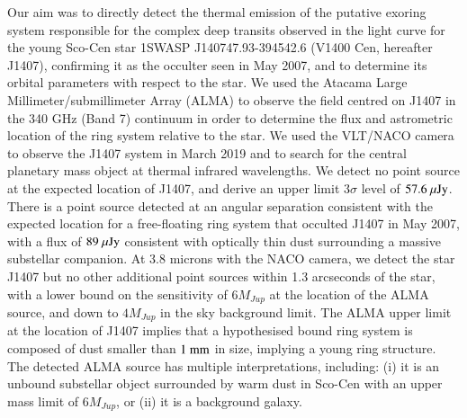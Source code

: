 \documentclass{aa} %
\begin{document}
   \date{Accepted 2019 November 16}


 
  \abstract
  {} %
  {Our aim was to directly detect the thermal emission of the putative exoring system responsible for the complex deep transits observed in the light curve for the young Sco-Cen star 1SWASP J140747.93-394542.6 (V1400 Cen, hereafter J1407), confirming it as the occulter seen in May 2007, and to determine its orbital parameters with respect to the star.}
  {We used the Atacama Large Millimeter/submillimeter Array (ALMA) to observe the field centred on J1407 in the 340 GHz (Band 7) continuum in order to determine the flux and astrometric location of the ring system relative to the star.
  We used the VLT/NACO camera to observe the J1407 system in March 2019 and to search for the central planetary mass object at thermal infrared wavelengths.}
    {We detect no point source at the expected location of J1407, and derive an upper limit $3\sigma$ level of $57.6~\mu\rm{Jy}$.
      There is a point source detected at an angular separation consistent with the expected location for a free-floating ring system that occulted J1407 in May 2007, with a flux of $89~\mu\rm{Jy}$ consistent with optically thin dust surrounding a massive substellar companion.
      At 3.8 microns with the NACO camera, we detect the star J1407 but no other additional point sources within 1.3 arcseconds of the star, with a lower bound on the sensitivity of $6M_{Jup}$ at the location of the ALMA source, and down to $4M_{Jup}$ in the sky background limit.
      }
   {The ALMA upper limit at the location of J1407 implies that a hypothesised bound ring system is composed of dust smaller than $1\rm{~mm}$ in size, implying a young ring structure.
   The detected ALMA source has multiple interpretations, including: (i) it is an unbound substellar object surrounded by warm dust in Sco-Cen with an upper mass limit of $6M_{Jup}$, or (ii) it is a background galaxy.
}
\end{document}
